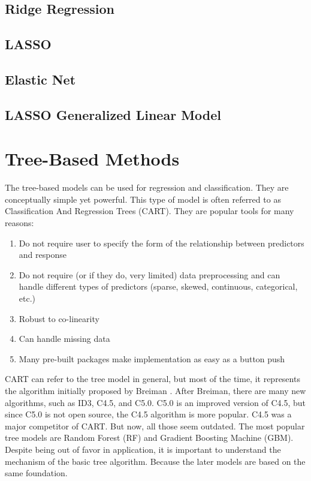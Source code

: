 \documentclass[12pt,]{krantz}
\providecommand{\tightlist}{%
  \setlength{\itemsep}{0pt}\setlength{\parskip}{0pt}}
\theoremstyle{definition}
\theoremstyle{definition}
\theoremstyle{definition}
\theoremstyle{remark}
\begin{document}
\section{Ridge Regression}\label{ridge-regression}

\section{LASSO}\label{lasso}

\section{Elastic Net}\label{elastic-net}

\section{LASSO Generalized Linear
Model}\label{lasso-generalized-linear-model}

\chapter{Tree-Based Methods}\label{tree-based-methods}

The tree-based models can be used for regression and classification.
They are conceptually simple yet powerful. This type of model is often
referred to as Classification And Regression Trees (CART). They are
popular tools for many reasons:

\begin{enumerate}
\def\labelenumi{\arabic{enumi}.}
\tightlist
\item
  Do not require user to specify the form of the relationship between
  predictors and response
\item
  Do not require (or if they do, very limited) data preprocessing and
  can handle different types of predictors (sparse, skewed, continuous,
  categorical, etc.)
\item
  Robust to co-linearity
\item
  Can handle missing data
\item
  Many pre-built packages make implementation as easy as a button push
\end{enumerate}

CART can refer to the tree model in general, but most of the time, it
represents the algorithm initially proposed by Breiman
\citep{Breiman1984}. After Breiman, there are many new algorithms, such
as ID3, C4.5, and C5.0. C5.0 is an improved version of C4.5, but since
C5.0 is not open source, the C4.5 algorithm is more popular. C4.5 was a
major competitor of CART. But now, all those seem outdated. The most
popular tree models are Random Forest (RF) and Gradient Boosting Machine
(GBM). Despite being out of favor in application, it is important to
understand the mechanism of the basic tree algorithm. Because the later
models are based on the same foundation.
\end{document}
